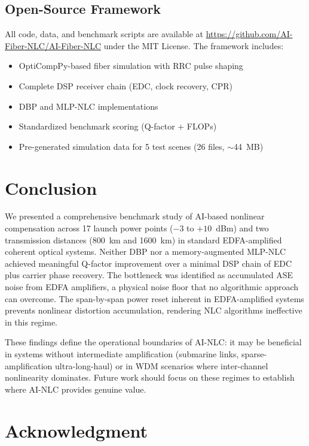 \documentclass[conference]{IEEEtran}
\begin{document}
\subsection{Open-Source Framework}

All code, data, and benchmark scripts are available at \url{https://github.com/AI-Fiber-NLC/AI-Fiber-NLC} under the MIT License. The framework includes:
\begin{itemize}
    \item OptiCompPy-based fiber simulation with RRC pulse shaping
    \item Complete DSP receiver chain (EDC, clock recovery, CPR)
    \item DBP and MLP-NLC implementations
    \item Standardized benchmark scoring (Q-factor + FLOPs)
    \item Pre-generated simulation data for 5 test scenes (26 files, $\sim$44~MB)
\end{itemize}

\section{Conclusion}

We presented a comprehensive benchmark study of AI-based nonlinear compensation across 17 launch power points ($-3$ to $+10$~dBm) and two transmission distances (800~km and 1600~km) in standard EDFA-amplified coherent optical systems. Neither DBP nor a memory-augmented MLP-NLC achieved meaningful Q-factor improvement over a minimal DSP chain of EDC plus carrier phase recovery. The bottleneck was identified as accumulated ASE noise from EDFA amplifiers, a physical noise floor that no algorithmic approach can overcome. The span-by-span power reset inherent in EDFA-amplified systems prevents nonlinear distortion accumulation, rendering NLC algorithms ineffective in this regime.

These findings define the operational boundaries of AI-NLC: it may be beneficial in systems without intermediate amplification (submarine links, sparse-amplification ultra-long-haul) or in WDM scenarios where inter-channel nonlinearity dominates. Future work should focus on these regimes to establish where AI-NLC provides genuine value.

\section*{Acknowledgment}
\end{document}
